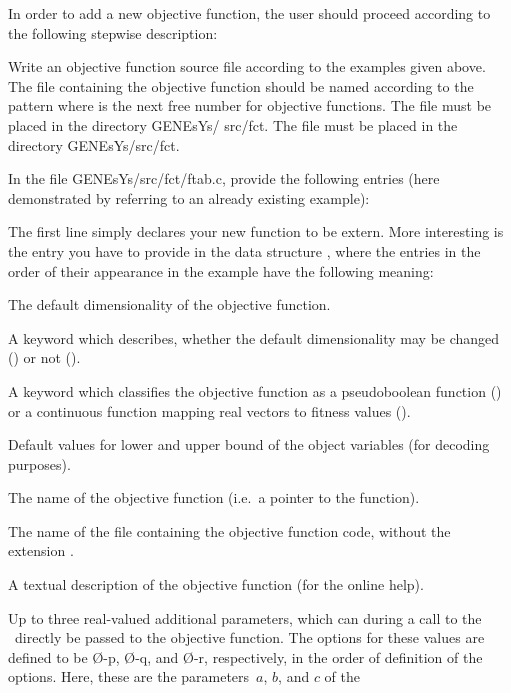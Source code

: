 In order to add a new objective function, the user should proceed
according to the following stepwise description:
%
\begin{Enumerate}
%
\item	Write an objective function source file according to the examples
	given above.
	The file containing the objective function should be named according to
	the pattern  where  is the next free number for
	objective functions.
\ifUS
	The file must be placed in the directory GENEsYs/ src/fct.
\else
	The file must be placed in the directory GENEsYs/src/fct.
\fi
%
\item	In the file GENEsYs/src/fct/ftab.c, provide the following entries
	(here demonstrated by referring to an already existing example):
	\begin{footnotesize}
	
	\end{footnotesize}
	The first line simply declares your new function to be extern.
	More interesting is the entry you have to provide in the data
	structure , where the entries in the order of their
	appearance in the example have the following meaning:
	\begin{Itemize}
	\item	The default dimensionality of the objective function.
	\item	A keyword which describes, whether the default dimensionality
		may be changed () or not ().
	\item	A keyword which classifies the objective function as a
		pseudoboolean function () or a continuous 
		function mapping real vectors to fitness values ().
	\item	Default values for lower and upper bound of the object
		variables (for decoding purposes).
	\item	The name of the objective function (i.e.~a pointer to the			function).
	\item	The name of the file containing the objective function code,
		without the extension .
	\item	A textual description of the objective function (for the
		online help).
	\item	Up to three real-valued additional parameters, which can 
		during a call to the \GA\ directly be passed to the 
		objective function.
		The options for these values are defined to be 
		\O{-p}, \O{-q}, and \O{-r}, respectively, in
		the order of definition of the options.
		Here, these are the parameters~$a$, $b$, and $c$ of the 

\end{Itemize}
\end{Enumerate}
